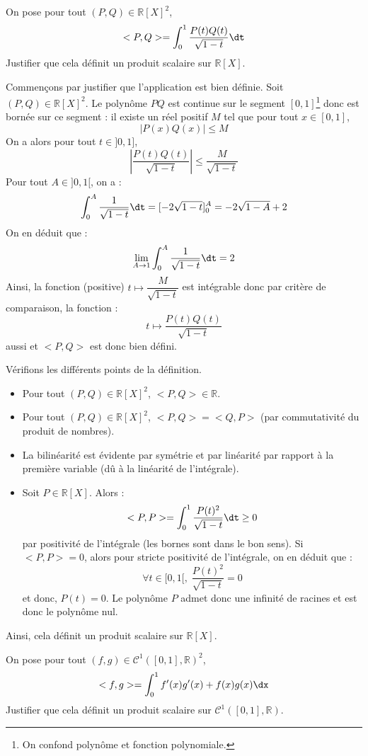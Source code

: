 \documentclass[a4paper,10pt]{report}
\begin{document}
\begin{Exa}\label{PS} On pose pour tout $(P,Q) \in \mathbb{R}[X]^2$,
$$ <P,Q> = \int_{0}^1 \dfrac{P(t)Q(t)}{\sqrt{1-t}} \dt $$
Justifier que cela définit un produit scalaire sur $\mathbb{R}[X]$.
\end{Exa}

\corr Commençons par justifier que l'application est bien définie. Soit $(P,Q) \in \mathbb{R}[X]^2$. Le polynôme $PQ$ est continue sur le segment $[0,1]$\footnote{On confond polynôme et fonction polynomiale.} donc est bornée sur ce segment : il existe un réel positif $M$ tel que pour tout $x \in [0,1]$,
$$ \vert P(x)Q(x) \vert \leq M$$
On a alors pour tout $t \in ]0,1]$,
$$ \left\vert  \dfrac{P(t)Q(t)}{\sqrt{1-t}} \right\vert \leq \dfrac{M}{\sqrt{1-t}}$$
Pour tout $A \in ]0,1[$, on a :
$$ \int_{0}^A \dfrac{1}{\sqrt{1-t}} \dt = [-2 \sqrt{1-t}]_0^A = - 2 \sqrt{1-A}+2$$
On en déduit que :
$$ \lim_{A \rightarrow 1}  \int_{0}^A \dfrac{1}{\sqrt{1-t}} \dt = 2$$
Ainsi, la fonction (positive) $t \mapsto \dfrac{M}{\sqrt{1-t}}$ est intégrable donc par critère de comparaison, la fonction :
$$ t \mapsto  \dfrac{P(t)Q(t)}{\sqrt{1-t}} $$
aussi et $<P,Q>$ est donc bien défini.

\medskip

\noindent Vérifions les différents points de la définition.

\begin{itemize}
\item Pour tout $(P,Q) \in \mathbb{R}[X]^2$, $<P,Q> \in \mathbb{R}$.
\item Pour tout $(P,Q) \in \mathbb{R}[X]^2$, $<P,Q>= <Q,P>$ (par commutativité du produit de nombres).
\item La bilinéarité est évidente par symétrie et par linéarité par rapport à la première variable (dû à la linéarité de l'intégrale).
\item Soit $P \in \mathbb{R}[X]$. Alors :
$$ <P,P> =\int_0^1 \dfrac{P(t)^2}{\sqrt{1-t}} \dt \geq 0$$
par positivité de l'intégrale (les bornes sont dans le bon sens). Si $<P,P>=0$, alors pour stricte positivité de l'intégrale, on en déduit que :
$$ \forall t \in [0,1[, \; \dfrac{P(t)^2}{\sqrt{1-t}}=0$$
et donc, $P(t)=0$. Le polynôme $P$ admet donc une infinité de racines et est donc le polynôme nul. 
\end{itemize}
Ainsi, cela définit un produit scalaire sur $\mathbb{R}[X]$.


\begin{Exa} \label{PS2} On pose pour tout $(f,g) \in \mathcal{C}^1([0,1],\mathbb{R})^2$,
$$ <f,g> = \int_{0}^1 f'(x)g'(x)+f(x)g(x) \dx$$
Justifier que cela définit un produit scalaire sur $\mathcal{C}^1([0,1],\mathbb{R})$.
\end{Exa} 
\end{document}
